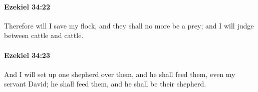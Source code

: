 		\paragraph{Ezekiel 34:22} %
			\label{EZEKIEL-34-22}

			Therefore will I save my flock, and they shall no more be a prey; and I will judge between cattle and cattle.


		\paragraph{Ezekiel 34:23} %
			\label{EZEKIEL-34-23}

			And I will set up one shepherd over them, and he shall feed them, even my servant David; he shall feed them, and he shall be their shepherd.


